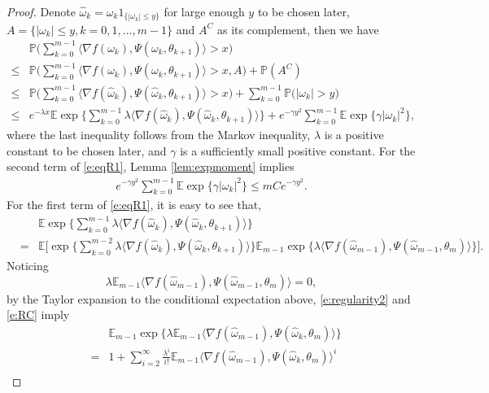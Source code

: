 \documentclass[12pt]{amsart}
\theoremstyle{definition}
\theoremstyle{remark}
\numberwithin{equation}{section}
\newcommand{\E}{\mathbb{E}}            %
\newcommand{\Ll}{\langle}
\newcommand{\Rr}{\rangle}
\newcommand{\PP}{\mathbb{P}}
\begin{document}
\begin{proof}
	Denote $\hat\omega_k=\omega_k1_{\{|\omega_k|\le y\}}$ for large enough $y$ to be chosen later, $A=\{|\omega_k|\le y, k=0,1,...,m-1\}$ and $A^C$ as its complement, then we have
	\begin{align}\label{e:eqR1}
		&\PP\Big(\sum_{k=0}^{m-1} \Ll \nabla f(\omega_k), \Psi(\omega_k,\theta_{k+1}) \Rr >x\Big)\nonumber\\
		\le& 		\PP\Big(\sum_{k=0}^{m-1} \Ll \nabla f(\omega_k), \Psi(\omega_k,\theta_{k+1}) \Rr >x, A\Big)+\PP(A^C)\nonumber\\
		\le& 		\PP\Big(\sum_{k=0}^{m-1} \Ll \nabla f(\hat\omega_k), \Psi(\hat\omega_k,\theta_{k+1}) \Rr >x\Big)+\sum_{k=0}^{m-1}\PP\big(|\omega_k|>y\big)\nonumber\\
		\le& e^{-\lambda x}\E\exp\Big\{\sum_{k=0}^{m-1}\lambda\Ll \nabla f(\hat\omega_k),\Psi(\hat\omega_k,\theta_{k+1})\Rr\Big\} +e^{-\gamma y^2}\sum_{k=0}^{m-1}\E\exp\{\gamma|\omega_k|^2\},
	\end{align}
	where the last inequality follows from the Markov inequality, $\lambda$ is a positive constant to be chosen later, and $\gamma$ is a sufficiently small positive constant. For the second term of \eqref{e:eqR1}, Lemma \ref{lem:expmoment} implies
	\begin{eqnarray*}
		e^{-\gamma y^2}\sum_{k=0}^{m-1}\E\exp\{\gamma|\omega_k|^2\}\le mCe^{-\gamma y^2}. 
	\end{eqnarray*}
	For the first term of \eqref{e:eqR1}, it is easy to see that,
	\begin{eqnarray*}
		&&\E\exp\Big\{\sum_{k=0}^{m-1}\lambda\Ll \nabla f(\hat\omega_k),\Psi(\hat\omega_k,\theta_{k+1})\Rr\Big\} \\
		&=&\E\Big[\exp\big\{\sum_{k=0}^{m-2}\lambda\Ll \nabla f(\hat\omega_k),\Psi(\hat\omega_k,\theta_{k+1})\Rr\big\} \E_{m-1}\exp\{\lambda\Ll \nabla f(\hat\omega_{m-1}),\Psi(\hat\omega_{m-1},\theta_{m})\Rr\}\Big].
	\end{eqnarray*}
	Noticing 
	$$\lambda\E_{m-1}\Ll \nabla f(\hat\omega_{m-1}),\Psi(\hat\omega_{m-1},\theta_{m})\Rr=0,$$ 
	by the Taylor expansion to the conditional expectation above, \eqref{e:regularity2}  and \eqref{e:RC} imply
	\begin{eqnarray*}
		&&\E_{m-1}\exp\{\lambda\E_{m-1}\Ll \nabla f(\hat\omega_{m-1}),\Psi(\hat\omega_k,\theta_{m})\Rr\}\\
		&=&1+\sum_{i=2}^{\infty}\frac{\lambda^i}{i!}\E_{m-1}\Ll \nabla f(\hat\omega_{m-1}), 
		\Psi(\hat\omega_k,\theta_{m})\Rr^i\\

\end{eqnarray*}
\end{proof}
\end{document}
